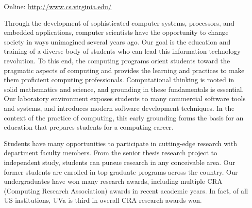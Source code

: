 \noindent Online: \url{http://www.cs.virginia.edu/}


Through the development of sophisticated computer systems, processors,
and embedded applications, computer scientists have the opportunity to
change society in ways unimagined several years ago. Our goal is the
education and training of a diverse body of students who can lead this
information technology revolution. To this end, the computing programs
orient students toward the pragmatic aspects of computing and provides
the learning and practices to make them proficient computing
professionals. Computational thinking is rooted in solid mathematics
and science, and grounding in these fundamentals is essential. Our
laboratory environment exposes students to many commercial software
tools and systems, and introduces modern software development
techniques.  In the context of the practice of computing, this early
grounding forms the basis for an education that prepares students for
a computing career.




Students have many opportunities to participate in cutting-edge research
with department faculty members. From the senior thesis research
project to independent study, students can pursue research in any
conceivable area. Our former students are enrolled in top graduate
programs across the country. Our undergraduates have won many research
awards, including multiple CRA (Computing Research Association)
awards in recent academic years. In fact, of all US
institutions, UVa is third in overall CRA research awards won.

